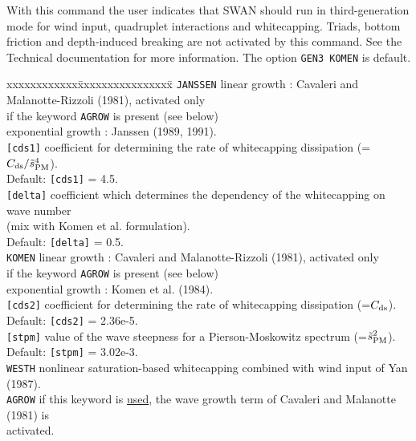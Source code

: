 \documentclass[12pt]{book}
\begin{document}
\noindent
With this command the user indicates that SWAN should run in third-generation mode for wind input, quadruplet interactions and whitecapping.
Triads, bottom friction and depth-induced breaking are not activated by this command. See the Technical documentation for more information.
The option {\tt GEN3 KOMEN} is default.
\begin{tabbing}
xxxxxxxxxxxx\=xxxxxxxxxxxxxxxx\= \kill
{\tt JANSSEN} \> linear growth      \>: Cavaleri and Malanotte-Rizzoli (1981), activated only\+\+\\
                                        if the keyword {\tt AGROW} is present (see below)\-\\
                 exponential growth \>: Janssen (1989, 1991).\-\\
{\tt [cds1]}  \> coefficient for determining the rate of whitecapping dissipation (=$C_{\rm ds}/\tilde{s}^4_{\rm PM}$).\+\\
                 Default: {\tt [cds1]} = 4.5.\-\\
{\tt [delta]} \> coefficient which determines the dependency of the whitecapping on wave number\+\\
                 (mix with Komen et al. formulation).\\
                 Default: {\tt [delta]} = 0.5.\-\\
{\tt KOMEN}   \> linear growth      \>: Cavaleri and Malanotte-Rizzoli (1981), activated only\+\+\\
                                        if the keyword {\tt AGROW} is present (see below)\-\\
                 exponential growth \>: Komen et al. (1984).\-\\
{\tt [cds2]}  \> coefficient for determining the rate of whitecapping dissipation (=$C_{\rm ds}$).\+\\
                 Default: {\tt [cds2]} = 2.36e-5.\-\\
{\tt [stpm]}  \> value of the wave steepness for a Pierson-Moskowitz spectrum (=$\tilde{s}^2_{\rm PM}$).\+\\
                 Default: {\tt [stpm]} = 3.02e-3.\-\\
{\tt WESTH}   \> nonlinear saturation-based whitecapping combined with wind input of Yan (1987).\\
{\tt AGROW}   \> if this keyword is \underline{used}, the wave growth term of Cavaleri and Malanotte (1981) is\+\\
                 activated.\\

\end{tabbing}
\end{document}
